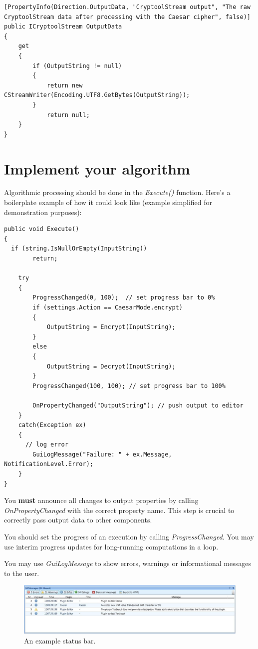 \begin{lstlisting}
[PropertyInfo(Direction.OutputData, "CryptoolStream output", "The raw CryptoolStream data after processing with the Caesar cipher", false)]
public ICryptoolStream OutputData
{
	get
	{
		if (OutputString != null)
		{
			return new CStreamWriter(Encoding.UTF8.GetBytes(OutputString));
		}
			return null;
	}
}
\end{lstlisting}

\section{Implement your algorithm}
\label{sec:ImplementingTheActualAlgorithm}

Algorithmic processing should be done in the \textit{Execute()} function. Here's a boilerplate example of how it could look like (example simplified for demonstration purposes):

\begin{lstlisting}
public void Execute()
{
  if (string.IsNullOrEmpty(InputString))
		return;
	
	try
	{
		ProgressChanged(0, 100);  // set progress bar to 0%
		if (settings.Action == CaesarMode.encrypt)
		{
			OutputString = Encrypt(InputString);
		}
		else
		{
			OutputString = Decrypt(InputString);
		}
		ProgressChanged(100, 100); // set progress bar to 100%
		
		OnPropertyChanged("OutputString"); // push output to editor
	}
	catch(Exception ex)
	{
	  // log error
		GuiLogMessage("Failure: " + ex.Message, NotificationLevel.Error);
	}
}
\end{lstlisting}

You \textbf{must} announce all changes to output properties by calling \textit{OnPropertyChanged} with the correct property name. This step is crucial to correctly pass output data to other components.

You should set the progress of an execution by calling \textit{ProgressChanged}. You may use interim progress updates for long-running computations in a loop.

You may use \textit{GuiLogMessage} to show errors, warnings or informational messages to the user.

\begin{figure}[h]
	\centering
		\includegraphics[width=1.00\textwidth]{figures/status_bar.jpg}
	\caption{An example status bar.}
	\label{fig:status_bar}
\end{figure}


